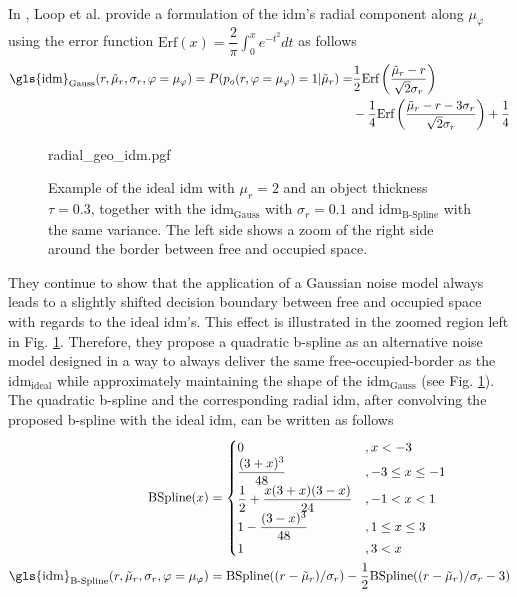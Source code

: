 \\
In \cite{loop2016closed}, Loop et al. provide a formulation of the \gls{idm}'s radial component along $\mu_\varphi$ using the error function $\text{Erf}(x) = \dfrac{2}{\pi} \int_{0}^{x}e^{-t^2}dt$ as follows 
\begin{align}
	\label{eq:gauss_idm}
	\text{\gls{idm}}_{\text{Gauss}}(r,\tilde{\mu}_r, \sigma_r, \varphi = \mu_\varphi) = P(p_o(r, \varphi = \mu_\varphi) = 1 |\tilde{\mu}_r)  =& \dfrac{1}{2}\text{Erf}\left(\dfrac{\tilde{\mu}_r-r}{\sqrt{2}\sigma_r}\right)\\
	&- \dfrac{1}{4}\text{Erf}\left(\dfrac{\tilde{\mu}_r - r - 3\sigma_r}{\sqrt{2}\sigma_r}\right) + \dfrac{1}{4} \notag
\end{align}
\begin{figure}
	\begin{center}
		{radial_geo_idm.pgf}
		\caption{\label{fig:radial_geo_idm}Example of the ideal \gls{idm} with $\mu_r = 2$ and an object thickness $\tau = 0.3$, together with the \gls{idm}$_{\text{Gauss}}$ with $\sigma_r = 0.1$ and \gls{idm}$_{\text{B-Spline}}$ with the same variance. The left side shows a zoom of the right side around the border between free and occupied space.}
	\end{center}
\end{figure} 
They continue to show that the application of a Gaussian noise model always leads to a slightly shifted decision boundary between free and occupied space with regards to the ideal \gls{idm}'s. This effect is illustrated in the zoomed region left in Fig. \ref{fig:radial_geo_idm}. Therefore, they propose a quadratic b-spline as an alternative noise model designed in a way to always deliver the same free-occupied-border as the \gls{idm}$_{\text{ideal}}$ while approximately maintaining the shape of the \gls{idm}$_{\text{Gauss}}$ (see Fig. \ref{fig:radial_geo_idm}). The quadratic b-spline and the corresponding radial \gls{idm}, after convolving the proposed b-spline with the ideal \gls{idm}, can be written as follows
\begin{align}
	\label{eq:bspline}
	\text{BSpline}(x) &= 
	\begin{cases}
		0 &, x < -3\\
		\dfrac{(3+x)^3}{48} &, -3 \leq x \leq -1\\
		\dfrac{1}{2}+\dfrac{x(3+x)(3-x)}{24} &, -1 < x < 1\\
		1-\dfrac{(3-x)^3}{48} &, 1 \leq x \leq 3\\
		1 &, 3 < x\\
	\end{cases}\\
%
	\label{eq:bspline_idm}
	\text{\gls{idm}}_{\text{B-Spline}}(r,\tilde{\mu}_r, \sigma_r, \varphi = \mu_\varphi) &= \text{BSpline}((r - \tilde{\mu}_r)/\sigma_r) - \dfrac{1}{2}\text{BSpline}((r - \tilde{\mu}_r)/\sigma_r - 3)
\end{align}
